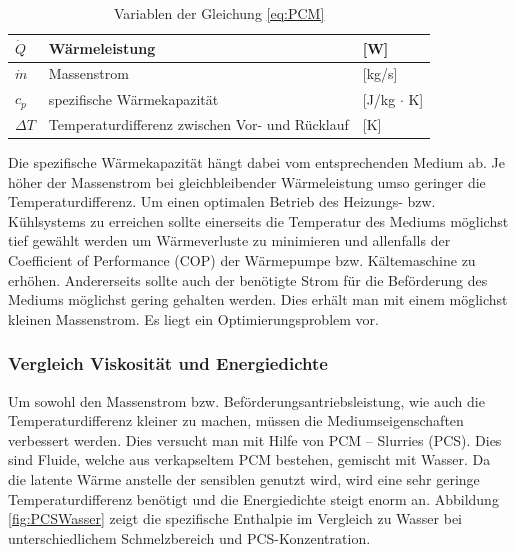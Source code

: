 \documentclass[11pt,a4paper]{scrartcl}
\begin{document}
\begin{table}[h!]
\begin{center}
\caption{Variablen der Gleichung \ref{eq:PCM}}
\begin{tabular}{|l|l|l|}
\hline $\dot{Q}$ & Wärmeleistung & [W] \\
\hline $\dot{m}$ & Massenstrom & [kg/s] \\
\hline $c_p$ & spezifische Wärmekapazität & [J/kg $\cdot$ K] \\
\hline $\Delta T$ & Temperaturdifferenz zwischen Vor- und Rücklauf & [K] \\
\hline
\end{tabular}
\end{center}
\end{table}
Die spezifische Wärmekapazität hängt dabei vom entsprechenden Medium ab. Je
höher der Massenstrom bei gleichbleibender Wärmeleistung umso geringer die
Temperaturdifferenz. Um einen optimalen Betrieb des Heizungs- bzw. Kühlsystems
zu erreichen sollte einerseits die Temperatur des Mediums möglichst tief gewählt
werden um Wärmeverluste zu minimieren und allenfalls der Coefficient of
Performance (COP) der Wärmepumpe bzw. Kältemaschine zu erhöhen. Andererseits
sollte auch der benötigte Strom für die Beförderung des Mediums möglichst gering
gehalten werden. Dies erhält man mit einem möglichst kleinen Massenstrom. Es
liegt ein Optimierungsproblem vor.

\subsubsection{Vergleich Viskosität und Energiedichte}
Um sowohl den Massenstrom bzw. Beförderungsantriebsleistung, wie auch die
Temperaturdifferenz kleiner zu machen, müssen die Mediumseigenschaften
verbessert werden. Dies versucht man mit Hilfe von PCM – Slurries (PCS). Dies
sind Fluide, welche aus verkapseltem PCM bestehen, gemischt mit Wasser. Da die
latente Wärme anstelle der sensiblen genutzt wird, wird eine sehr geringe
Temperaturdifferenz benötigt und die Energiedichte steigt enorm an.
Abbildung \ref{fig:PCSWasser} zeigt die spezifische Enthalpie im Vergleich zu
Wasser bei unterschiedlichem Schmelzbereich und PCS-Konzentration.
\end{document}
